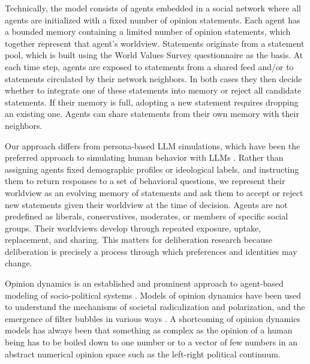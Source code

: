\documentclass[]{ceurart}
\begin{document}
Technically, the model consists of agents embedded in a social network
where all agents are initialized with a fixed number of opinion
statements. Each agent has a bounded memory containing a limited number
of opinion statements, which together represent that agent's worldview.
Statements originate from a statement pool, which is built using the
World Values Survey questionnaire as the basis. At each time step,
agents are exposed to statements from a shared feed and/or to statements
circulated by their network neighbors. In both cases they then decide
whether to integrate one of these statements into memory or reject all
candidate statements. If their memory is full, adopting a new statement
requires dropping an existing one. Agents can share statements from
their own memory with their neighbors.~

Our approach differs from persona-based LLM simulations, which have been
the preferred approach to simulating human behavior with LLMs
\citep{ArgyleEtAl2023OutOneMany, PromaEtAl2026CanLLMsEmulate}. Rather
than assigning agents fixed demographic profiles or ideological labels,
and instructing them to return responses to a set of behavioral
questions, we represent their worldview as an evolving memory of
statements and ask them to accept or reject new statements given their
worldview at the time of decision. Agents are not predefined as
liberals, conservatives, moderates, or members of specific social
groups. Their worldviews develop through repeated exposure, uptake,
replacement, and sharing. This matters for deliberation research because
deliberation is precisely a process through which preferences and
identities may change.

Opinion dynamics is an established and prominent approach to agent-based
modeling of socio-political systems
\citep{FlacheEtAl2017ModelsSocialInfluence, LorenzEtAl2021IndividualAttitudeChange}.
Models of opinion dynamics have been used to understand the mechanisms
of societal radicalization and polarization, and the emergence of filter
bubbles in various ways
\citep{KeijzerMaes2022ComplexLinkFilter, KeijzerEtAl2026ComputationalSocialScience}.
A shortcoming of opinion dynamics models has always been that something
as complex as the opinion of a human being has to be boiled down to one
number or to a vector of few numbers in an abstract numerical opinion
space such as the left-right political continuum.
\end{document}
